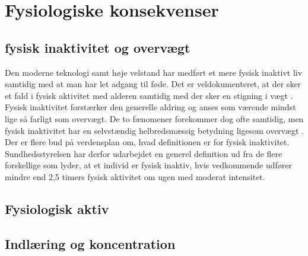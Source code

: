 \section{Fysiologiske konsekvenser}


\subsection{fysisk inaktivitet og overvægt}
Den moderne teknologi samt høje velstand har medført et mere fysisk inaktivt liv samtidig med at man har let adgang til føde. \cite{Kiens2007} Det er veldokumenteret, at der sker et fald i fysisk aktivitet med alderen samtidig med der sker en stigning i vægt \cite{Kaprio2008}. Fysisk inaktivitet forstærker den generelle aldring og anses som værende mindst lige så farligt som overvægt. De to fænomener forekommer dog ofte samtidig, men fysisk inaktivitet har en selvstændig helbredsmæssig betydning ligesom overvægt \cite{Kaprio2008,Hjort1997,Kiens2007}.\\
Der er flere bud på verdensplan om, hvad definitionen er for fysisk inaktivitet. Sundhedsstyrelsen har derfor udarbejdet en generel definition ud fra de flere forskellige som lyder, at et individ er fysisk inaktiv, hvis vedkommende udfører mindre end 2,5 timers fysisk aktivitet om ugen med moderat intensitet. \cite{kiens2007}

\subsection{Fysiologisk aktiv}

\subsection{Indlæring og koncentration}

